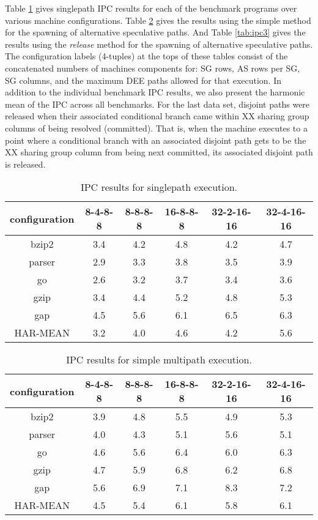 \documentclass[10pt,dvips]{article}
\begin{document}
%
Table \ref{tab:ipc1} gives singlepath IPC results for each of the benchmark
programs over various machine configurations.
Table \ref{tab:ipc2} gives the results using the simple method for
the spawning of alternative speculative paths.
And Table \ref{tab:ipc3} gives the results using the \textit{release} 
method for
the spawning of alternative speculative paths.
The configuration labels 
(4-tuples) 
at the tops of these tables consist of the concatenated 
numbers of
machines components for: SG rows, AS rows per SG, SG columns,
and the maximum DEE paths allowed for that execution.
In addition to the individual benchmark IPC results, we also
present the harmonic mean of the IPC across all benchmarks.
For the last data set, disjoint paths were released when their
associated conditional branch came
within XX sharing group columns of being resolved (committed).
That is, when the machine executes to a point where a conditional branch
with an associated disjoint path gets to be the XX sharing group column
from being next committed, its associated disjoint path is released.
%
\begin{table}
\begin{center}
\caption{IPC results for singlepath execution.}
\label{tab:ipc1}
\begin{tabular}{|c|c|c|c|c|c|}
\hline 
configuration&
8-4-8-8&
8-8-8-8&
16-8-8-8&
32-2-16-16&
32-4-16-16\\
\hline 
\hline
bzip2&3.4&4.2&4.8&4.2&4.7\\
\hline 
parser&2.9&3.3&3.8&3.5&3.9\\
\hline 
go&2.6&3.2&3.7&3.4&3.6\\
\hline 
gzip&3.4&4.4&5.2&4.8&5.3\\
\hline 
gap&4.5&5.6&6.1&6.5&6.3\\
\hline
\hline 
HAR-MEAN&3.2&4.0&4.6&4.2&5.6\\
\hline
\end{tabular}
\end{center}
\end{table}
%
\begin{table}
\begin{center}
\caption{IPC results for simple multipath execution.}
\label{tab:ipc2}
\begin{tabular}{|c|c|c|c|c|c|}
\hline 
configuration&
8-4-8-8&
8-8-8-8&
16-8-8-8&
32-2-16-16&
32-4-16-16\\
\hline 
\hline 
bzip2&3.9&4.8&5.5&4.9&5.3\\
\hline 
parser&4.0&4.3&5.1&5.6&5.1\\
\hline 
go&4.6&5.6&6.4&6.0&6.3\\
\hline 
gzip&4.7&5.9&6.8&6.2&6.8\\
\hline 
gap&5.6&6.9&7.1&8.3&7.2\\
\hline 
\hline 
HAR-MEAN&4.5&5.4&6.1&5.8&6.1\\
\hline
\end{tabular}
\end{center}
\end{table}
\end{document}
